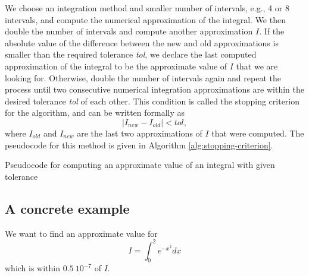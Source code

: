 We choose an integration method and smaller number of intervals, e.g., 4 or 8
    intervals, and compute the numerical approximation of the integral.
We then double the number of intervals and compute another approximation $ I $.
If the absolute value of the difference between the new and old approximations
    is smaller than the required tolerance \textit{tol}, we declare the last
    computed approximation of the integral to be the approximate value of $ I $
    that we are looking for.
Otherwise, double the number of intervals again and repeat the process until two
    consecutive numerical integration approximations are within the desired
    tolerance \textit{tol} of each other.
This condition is called the stopping criterion for the algorithm, and can be
    written formally as
\begin{equation}
    | I_{new} - I_{old} | < tol,
    \label{eq:stopping-criterion}
\end{equation}
where $ I_{old} $ and $ I_{new} $ are the last two approximations of $ I $ that
    were computed.
The pseudocode for this method is given in Algorithm
    \ref{alg:stopping-criterion}.
\begin{algorithm}
    \caption{Pseudocode for computing an approximate value of an integral with
        given tolerance}
    \label{alg:stopping-criterion}
    \begin{algorithmic}

        \State{}


        \State{}

        \EndWhile
    \end{algorithmic}
\end{algorithm}

\subsection{A concrete example}
We want to find an approximate value for
\begin{equation*}
    I = \int_{0}^{2} e^{-x^2} dx
\end{equation*}
which is within $ 0.5\ 10^{-7} $ of $ I $.

